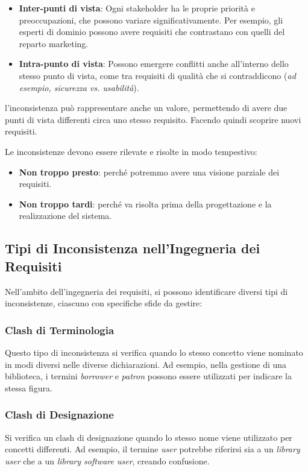 \begin{itemize}
    \item \textbf{Inter-punti di vista}: Ogni stakeholder ha le proprie priorità
    e preoccupazioni, che possono variare significativamente. Per esempio, gli
    esperti di dominio possono avere requisiti che contrastano con quelli del
    reparto marketing.
    \item \textbf{Intra-punto di vista}: Possono emergere conflitti anche all'interno
    dello stesso punto di vista, come tra requisiti di qualità che si contraddicono
    (\textit{ad esempio, sicurezza vs. usabilità}).
\end{itemize}

l'inconsistenza può rappresentare anche un valore,
permettendo di avere due punti di vista differenti circa uno stesso requisito. Facendo 
quindi scoprire nuovi requisiti. 

Le inconsistenze devono essere rilevate e risolte in modo tempestivo:
\begin{itemize}
    \item \textbf{Non troppo presto}: perché potremmo avere una visione parziale 
    dei requisiti.
    \item \textbf{Non troppo tardi}: perché va risolta prima della progettazione e 
    la realizzazione del sistema.
\end{itemize}

\subsection{Tipi di Inconsistenza nell'Ingegneria dei Requisiti}

Nell'ambito dell'ingegneria dei requisiti, si possono identificare diversi tipi di
inconsistenze, ciascuno con specifiche sfide da gestire:

\subsubsection{Clash di Terminologia}
Questo tipo di inconsistenza si verifica quando lo stesso concetto viene nominato
in modi diversi nelle diverse dichiarazioni. Ad esempio, nella gestione di una
biblioteca, i termini \textit{borrower} e \textit{patron} possono essere
utilizzati per indicare la stessa figura.

\subsubsection{Clash di Designazione}
Si verifica un clash di designazione quando lo stesso nome viene utilizzato
per concetti differenti. Ad esempio, il termine \textit{user} potrebbe riferirsi
sia a un \textit{library user} che a un \textit{library software user},
creando confusione.

